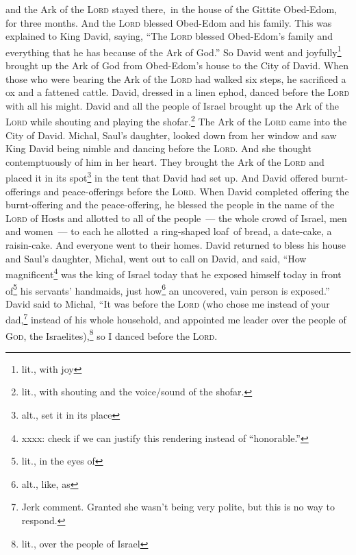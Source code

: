 \begin{inparaenum}
     and the Ark of the \textsc{Lord} stayed there,\understood\ in the house of the Gittite Obed-Edom, for three months. And the \textsc{Lord} blessed Obed-Edom and his family.%
     This was explained to King David, saying, ``The \textsc{Lord} blessed Obed-Edom's family and everything that he has because of the Ark of God.'' So David went and joyfully\footnote{lit., with joy} brought up the Ark of God from Obed-Edom's house to the City of David.%
     When those who were bearing the Ark of the \textsc{Lord} had walked six steps, he sacrificed a ox and a fattened cattle.%
     David, dressed in a linen ephod, danced before the \textsc{Lord} with all his might.%
     David and all the people of Israel brought up the Ark of the \textsc{Lord} while shouting and playing the shofar.\footnote{lit., with shouting and the voice/sound of the shofar.}%
     The Ark of the \textsc{Lord} came into the City of David. Michal, Saul's daughter, looked down from her window and saw King David being nimble and dancing before the \textsc{Lord}. And she thought contemptuously of him in her heart.%
     They brought the Ark of the \textsc{Lord} and placed it in its spot\footnote{alt., set it in its place} in the tent that David had set up. And David offered burnt-offerings and peace-offerings before the \textsc{Lord}.%
     When David completed offering the burnt-offering and the peace-offering, he blessed the people in the name of the \textsc{Lord} of Hosts%
     and allotted to all of the people~--- the whole crowd of Israel, men and women~--- to each he allotted\understood\ a ring-shaped loaf\understood\ of bread, a date-cake, a raisin-cake. And everyone went to their homes.%
     David returned to bless his house and Saul's daughter, Michal, went out to call on David, and said, ``How magnificent\footnote{xxxx: check if we can justify this rendering instead of ``honorable.''} was the king of Israel today that he exposed himself today in front of\footnote{lit., in the eyes of} his servants' handmaids, just how\footnote{alt., like, as} an uncovered, vain person is exposed.''%
     David said to Michal, ``It was before the \textsc{Lord} (who chose me instead of your dad,\footnote{Jerk comment. Granted she wasn't being very polite, but this is no way to respond.} instead of his whole household, and appointed me leader over the people of \textsc{God}, the Israelites),\footnote{lit., over the people of Israel} so I danced before the \textsc{Lord}.%

\end{inparaenum}
